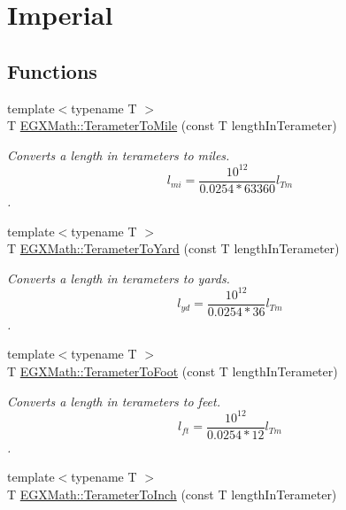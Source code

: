 \hypertarget{group___e_g_x_math-_conversions-_length_conversions-_s_i-_terameter-_imperial}{}\section{Imperial}
\label{group___e_g_x_math-_conversions-_length_conversions-_s_i-_terameter-_imperial}
\subsection*{Functions}
\begin{DoxyCompactItemize}
\item 
{\footnotesize template$<$typename T $>$ }\\T \mbox{\hyperlink{group___e_g_x_math-_conversions-_length_conversions-_s_i-_terameter-_imperial_ga51468f3ffd5925fb2cbb188d49b6aa60}{E\+G\+X\+Math\+::\+Terameter\+To\+Mile}} (const T length\+In\+Terameter)
\begin{DoxyCompactList}\small\item\em Converts a length in terameters to miles. \[ l_{mi}=\frac{10^{12}}{0.0254 * 63360} l_{Tm} \]. \end{DoxyCompactList}\item 
{\footnotesize template$<$typename T $>$ }\\T \mbox{\hyperlink{group___e_g_x_math-_conversions-_length_conversions-_s_i-_terameter-_imperial_ga4f3bcac82e02fddb21fedf80ec01275b}{E\+G\+X\+Math\+::\+Terameter\+To\+Yard}} (const T length\+In\+Terameter)
\begin{DoxyCompactList}\small\item\em Converts a length in terameters to yards. \[ l_{yd}= \frac{10^{12}}{0.0254 * 36} l_{Tm} \]. \end{DoxyCompactList}\item 
{\footnotesize template$<$typename T $>$ }\\T \mbox{\hyperlink{group___e_g_x_math-_conversions-_length_conversions-_s_i-_terameter-_imperial_gaf903b744223a3acb964367da6f14b96f}{E\+G\+X\+Math\+::\+Terameter\+To\+Foot}} (const T length\+In\+Terameter)
\begin{DoxyCompactList}\small\item\em Converts a length in terameters to feet. \[ l_{ft}= \frac{10^{12}}{0.0254 * 12} l_{Tm} \]. \end{DoxyCompactList}\item 
{\footnotesize template$<$typename T $>$ }\\T \mbox{\hyperlink{group___e_g_x_math-_conversions-_length_conversions-_s_i-_terameter-_imperial_ga85c9ddc82ba02c1fea0b22b896fed936}{E\+G\+X\+Math\+::\+Terameter\+To\+Inch}} (const T length\+In\+Terameter)

\end{DoxyCompactItemize}
